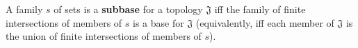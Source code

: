 A family $s$ of sets is a \textbf{subbase} for a topology $\mathfrak{J}$ iff the family of finite intersections of members of $s$ is a base for $\mathfrak{J}$ (equivalently, iff each member of $\mathfrak{J}$ is the union of finite intersections of members of $s$).
